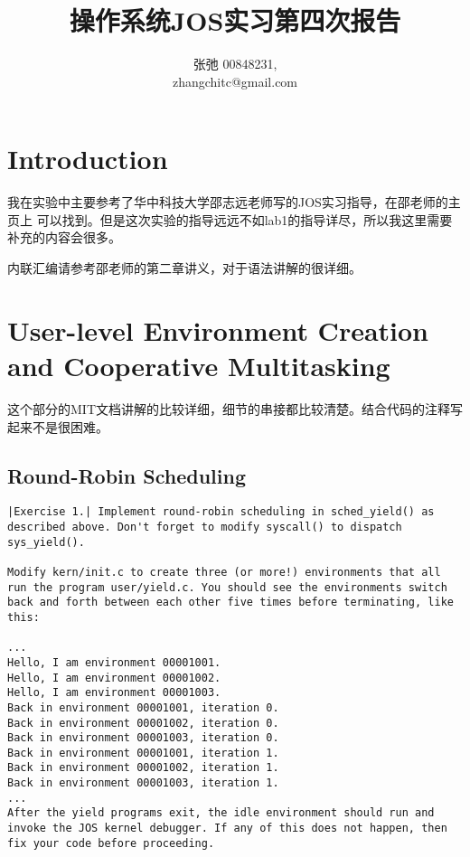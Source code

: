 \documentclass{article}
\begin{document}
\begin{CJK*}{UTF8}{gkai}

\title{操作系统JOS实习第四次报告}
\author{张弛 \hspace{1ex} 00848231, \\
        zhangchitc@gmail.com}

\maketitle
\tableofcontents
\newpage

\section{Introduction}

我在实验中主要参考了华中科技大学邵志远老师写的JOS实习指导，在邵老师的主页上 可以找到。但是这次实验的指导远远不如lab1的指导详尽，所以我这里需要补充的内容会很多。

内联汇编请参考邵老师的第二章讲义，对于语法讲解的很详细。


\section{User-level Environment Creation and Cooperative Multitasking}

这个部分的MIT文档讲解的比较详细，细节的串接都比较清楚。结合代码的注释写起来不是很困难。

\subsection{Round-Robin Scheduling}

\begin{lstlisting}[style=exercise]
|Exercise 1.| Implement round-robin scheduling in sched_yield() as described above. Don't forget to modify syscall() to dispatch sys_yield().

Modify kern/init.c to create three (or more!) environments that all run the program user/yield.c. You should see the environments switch back and forth between each other five times before terminating, like this:

...
Hello, I am environment 00001001.
Hello, I am environment 00001002.
Hello, I am environment 00001003.
Back in environment 00001001, iteration 0.
Back in environment 00001002, iteration 0.
Back in environment 00001003, iteration 0.
Back in environment 00001001, iteration 1.
Back in environment 00001002, iteration 1.
Back in environment 00001003, iteration 1.
...
After the yield programs exit, the idle environment should run and invoke the JOS kernel debugger. If any of this does not happen, then fix your code before proceeding.
\end{lstlisting}


\end{CJK*}
\end{document}
